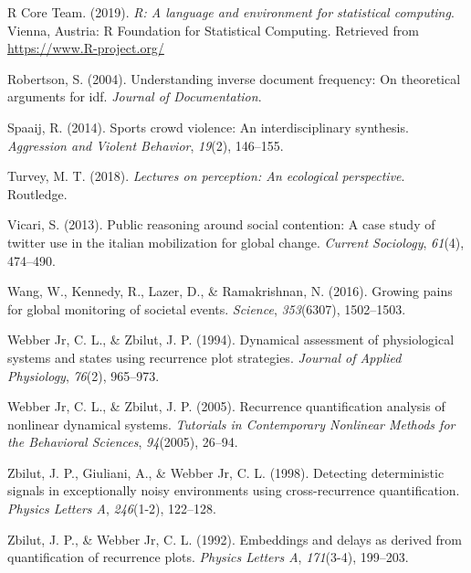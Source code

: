 \documentclass[english,man]{apa6}
\begin{document}
\leavevmode\hypertarget{ref-R-base}{}%
R Core Team. (2019). \emph{R: A language and environment for statistical computing}. Vienna, Austria: R Foundation for Statistical Computing. Retrieved from \url{https://www.R-project.org/}

\leavevmode\hypertarget{ref-robertson2004understanding}{}%
Robertson, S. (2004). Understanding inverse document frequency: On theoretical arguments for idf. \emph{Journal of Documentation}.

\leavevmode\hypertarget{ref-spaaij2014sports}{}%
Spaaij, R. (2014). Sports crowd violence: An interdisciplinary synthesis. \emph{Aggression and Violent Behavior}, \emph{19}(2), 146--155.

\leavevmode\hypertarget{ref-turvey2018lectures}{}%
Turvey, M. T. (2018). \emph{Lectures on perception: An ecological perspective}. Routledge.

\leavevmode\hypertarget{ref-vicari2013public}{}%
Vicari, S. (2013). Public reasoning around social contention: A case study of twitter use in the italian mobilization for global change. \emph{Current Sociology}, \emph{61}(4), 474--490.

\leavevmode\hypertarget{ref-wang2016growing}{}%
Wang, W., Kennedy, R., Lazer, D., \& Ramakrishnan, N. (2016). Growing pains for global monitoring of societal events. \emph{Science}, \emph{353}(6307), 1502--1503.

\leavevmode\hypertarget{ref-webber1994dynamical}{}%
Webber Jr, C. L., \& Zbilut, J. P. (1994). Dynamical assessment of physiological systems and states using recurrence plot strategies. \emph{Journal of Applied Physiology}, \emph{76}(2), 965--973.

\leavevmode\hypertarget{ref-webber2005recurrence}{}%
Webber Jr, C. L., \& Zbilut, J. P. (2005). Recurrence quantification analysis of nonlinear dynamical systems. \emph{Tutorials in Contemporary Nonlinear Methods for the Behavioral Sciences}, \emph{94}(2005), 26--94.

\leavevmode\hypertarget{ref-zbilut1998detecting}{}%
Zbilut, J. P., Giuliani, A., \& Webber Jr, C. L. (1998). Detecting deterministic signals in exceptionally noisy environments using cross-recurrence quantification. \emph{Physics Letters A}, \emph{246}(1-2), 122--128.

\leavevmode\hypertarget{ref-zbilut1992embeddings}{}%
Zbilut, J. P., \& Webber Jr, C. L. (1992). Embeddings and delays as derived from quantification of recurrence plots. \emph{Physics Letters A}, \emph{171}(3-4), 199--203.
\end{document}
